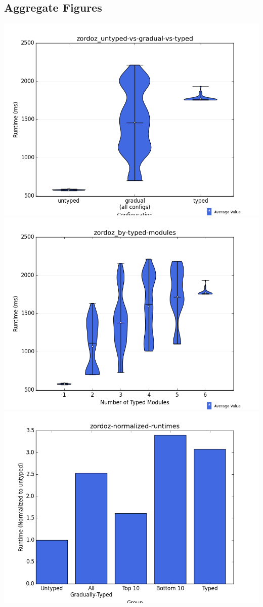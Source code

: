 \documentclass{article}
\begin{document}
\subsection{Aggregate Figures}
\includegraphics[width=\textwidth]{zordoz_untyped-vs-gradual-vs-typed-violin.png}
\includegraphics[width=\textwidth]{zordoz_by-typed-modules-violin.png}
\includegraphics[width=\textwidth]{zordoz-normalized-runtimes-bar.png}
\end{document}
